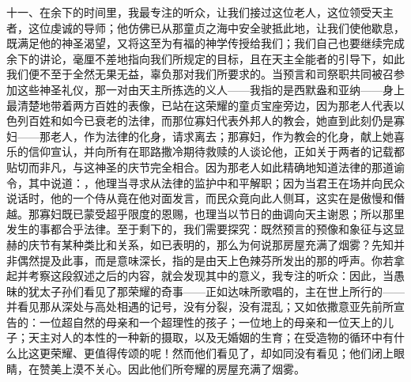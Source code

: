 十一、\newline{}在余下的时间里，我最专注的听众，让我们接过这位老人，这位领受天主者，这位虔诚的导师；他仿佛已从那童贞之海中安全驶抵此地，让我们使他歇息，既满足他的神圣渴望，又将这至为有福的神学传授给我们；我们自己也要继续完成余下的讲论，毫厘不差地指向我们所规定的目标，且在天主全能者的引导下，如此我们便不至于全然无果无益，辜负那对我们所要求的。当预言和司祭职共同被召参加这些神圣礼仪，那一对由天主所拣选的义人——我指的是西默盎和亚纳——身上最清楚地带着两方百姓的表像，已站在这荣耀的童贞宝座旁边，因为那老人代表以色列百姓和如今已衰老的法律，而那位寡妇代表外邦人的教会，她直到此刻仍是寡妇——那老人，作为法律的化身，请求离去；那寡妇，作为教会的化身，献上她喜乐的信仰宣认，并向所有在耶路撒冷期待救赎的人谈论他，正如关于两者的记载都贴切而非凡，与这神圣的庆节完全相合。因为那老人如此精确地知道法律的那道谕令，其中说道：，他理当寻求从法律的监护中和平解职；因为当君王在场并向民众说话时，他的一个侍从竟在他对面发言，而民众竟向此人侧耳，这实在是傲慢和僭越。那寡妇既已蒙受超乎限度的恩赐，也理当以节日的曲调向天主谢恩；所以那里发生的事都合乎法律。至于剩下的，我们需要探究：既然预言的预像和象征与这显赫的庆节有某种类比和关系，如已表明的，那么为何说那房屋充满了烟雾？先知并非偶然提及此事，而是意味深长，指的是由天上色辣芬所发出的那的呼声。你若拿起并考察这段叙述之后的内容，就会发现其中的意义，我专注的听众：因此，当愚昧的犹太子孙们看见了那荣耀的奇事——正如达味所歌唱的，主在世上所行的——并看见那从深处与高处相遇的记号，没有分裂，没有混乱；又如依撒意亚先前所宣告的：一位超自然的母亲和一个超理性的孩子；一位地上的母亲和一位天上的儿子；天主对人的本性的一种新的摄取，以及无婚姻的生育；在受造物的循环中有什么比这更荣耀、更值得传颂的呢！然而他们看见了，却如同没有看见；他们闭上眼睛，在赞美上漠不关心。因此他们所夸耀的房屋充满了烟雾。\par

